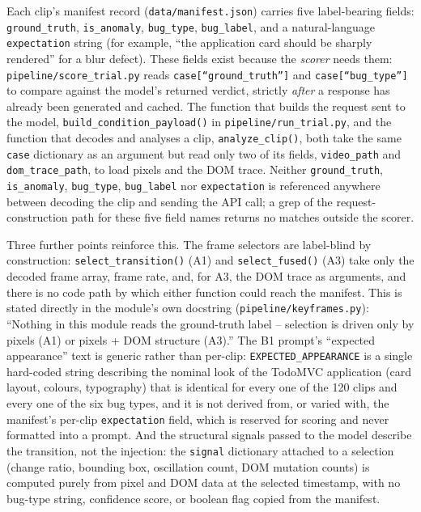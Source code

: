 Each clip's manifest record (\texttt{data/manifest.json}) carries five label-bearing fields: \texttt{ground\_truth}, \texttt{is\_anomaly}, \texttt{bug\_type}, \texttt{bug\_label}, and a natural-language \texttt{expectation} string (for example, ``the application card should be sharply rendered'' for a blur defect). These fields exist because the \emph{scorer} needs them: \texttt{pipeline/score\_trial.py} reads \texttt{case[``ground\_truth'']} and \texttt{case[``bug\_type'']} to compare against the model's returned verdict, strictly \emph{after} a response has already been generated and cached. The function that builds the request sent to the model, \texttt{build\_condition\_payload()} in \texttt{pipeline/run\_trial.py}, and the function that decodes and analyses a clip, \texttt{analyze\_clip()}, both take the same \texttt{case} dictionary as an argument but read only two of its fields, \texttt{video\_path} and \texttt{dom\_trace\_path}, to load pixels and the DOM trace. Neither \texttt{ground\_truth}, \texttt{is\_anomaly}, \texttt{bug\_type}, \texttt{bug\_label} nor \texttt{expectation} is referenced anywhere between decoding the clip and sending the API call; a grep of the request-construction path for these five field names returns no matches outside the scorer.

Three further points reinforce this. The frame selectors are label-blind by construction: \texttt{select\_transition()} (A1) and \texttt{select\_fused()} (A3) take only the decoded frame array, frame rate, and, for A3, the DOM trace as arguments, and there is no code path by which either function could reach the manifest. This is stated directly in the module's own docstring (\texttt{pipeline/keyframes.py}): ``Nothing in this module reads the ground-truth label -- selection is driven only by pixels (A1) or pixels + DOM structure (A3).'' The B1 prompt's ``expected appearance'' text is generic rather than per-clip: \texttt{EXPECTED\_APPEARANCE} is a single hard-coded string describing the nominal look of the TodoMVC application (card layout, colours, typography) that is identical for every one of the 120 clips and every one of the six bug types, and it is not derived from, or varied with, the manifest's per-clip \texttt{expectation} field, which is reserved for scoring and never formatted into a prompt. And the structural signals passed to the model describe the transition, not the injection: the \texttt{signal} dictionary attached to a selection (change ratio, bounding box, oscillation count, DOM mutation counts) is computed purely from pixel and DOM data at the selected timestamp, with no bug-type string, confidence score, or boolean flag copied from the manifest.

